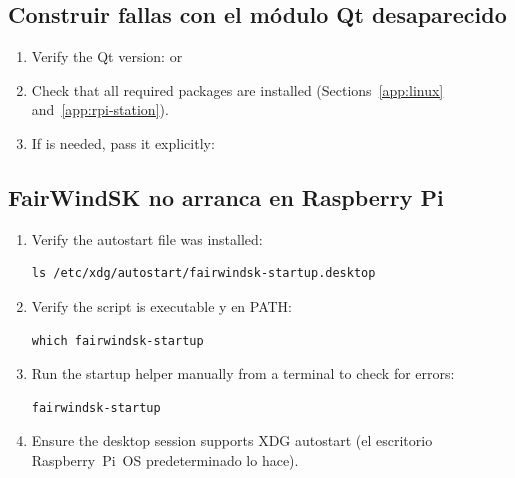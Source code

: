 \subsection{Construir fallas con el módulo Qt desaparecido}

\begin{enumerate}
  \item Verify the Qt version:  or
  \item Check that all required packages are installed
        (Sections~\ref{app:linux} and~\ref{app:rpi-station}).
  \item If  is needed, pass it explicitly:
\end{enumerate}

\subsection{FairWindSK no arranca en Raspberry Pi}

\begin{enumerate}
  \item Verify the autostart file was installed:
\begin{lstlisting}
ls /etc/xdg/autostart/fairwindsk-startup.desktop
\end{lstlisting}
  \item Verify the  script is executable
y en PATH:
\begin{lstlisting}
which fairwindsk-startup
\end{lstlisting}
  \item Run the startup helper manually from a terminal to check for errors:
\begin{lstlisting}
fairwindsk-startup
\end{lstlisting}
  \item Ensure the desktop session supports XDG autostart
(el escritorio Raspberry~Pi~OS predeterminado lo hace).
\end{enumerate}
